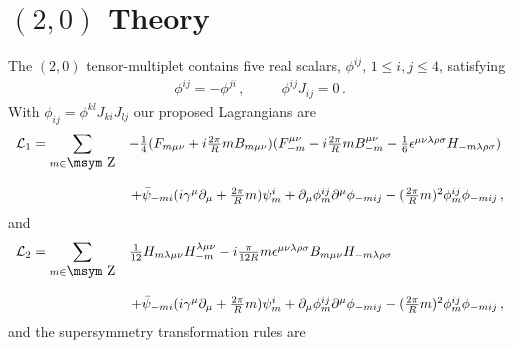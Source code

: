 \documentclass[a4paper,12pt]{article}
\def\Integer{{\mathop{\hbox{\msym \char  '132}}}}
\def\L{{\cal L}}
\def\pr{{\textstyle{\frac{2\pi}{R}}}}
\begin{document}
\section{$(2,0)$ Theory\label{sec20}}
The $(2,0)$ tensor-multiplet contains five real scalars, $\phi^{ij},\,1\leq i,j\leq 4$, satisfying
\begin{equation}
\begin{array}{cc}
\phi^{ij}=-\phi^{ji}\,,~~~~&~~~~\phi^{ij}J_{ij}=0\,.
\end{array}
\end{equation}
With $\phi_{ij}=\phi^{kl}J_{ki}J_{lj}$ our  proposed Lagrangians  are 
\begin{equation}
\begin{array}{ll}
\L_{1}=\displaystyle{\sum_{m\in\Integer}}&-\textstyle{\frac{1}{4}}(F_{m\mu\nu}+i\pr mB_{m\mu\nu})(F_{-m}^{\mu\nu}-i\pr mB_{-m}^{\mu\nu}-\textstyle{\frac{1}{6}}\epsilon^{\mu\nu\lambda\rho\sigma}H_{-m\lambda\rho\sigma})\\
{}&{}\\
{}&\,+\bar{\psi}_{-mi}(i\gamma^{\mu}\partial_{\mu}+\pr m)\psi^{i}_{m}+\partial_{\mu}\phi^{ij}_{m}\partial^{\mu}\phi_{-mij}-(\pr m)^{2}\phi^{ij}_{m}\phi_{-mij}\,,
\end{array}
\end{equation}
and 
\begin{equation}
\begin{array}{ll}
\L_{2}=\displaystyle{\sum_{m\in\Integer}}&\textstyle{\frac{1}{12}}
H_{m\lambda\mu\nu}H_{-m}^{\lambda\mu\nu}-i\textstyle{\frac{\pi}{12R}}m
\epsilon^{\mu\nu\lambda\rho\sigma}B_{m\mu\nu}H_{-m\lambda\rho\sigma}\\
{}&{}\\
{}&\,+\bar{\psi}_{-mi}(i\gamma^{\mu}\partial_{\mu}+\pr m)\psi^{i}_{m}+\partial_{\mu}\phi^{ij}_{m}\partial^{\mu}\phi_{-mij}-(\pr m)^{2}\phi^{ij}_{m}\phi_{-mij}\,,
\end{array}
\end{equation}
and  the   supersymmetry transformation rules are
\end{document}
